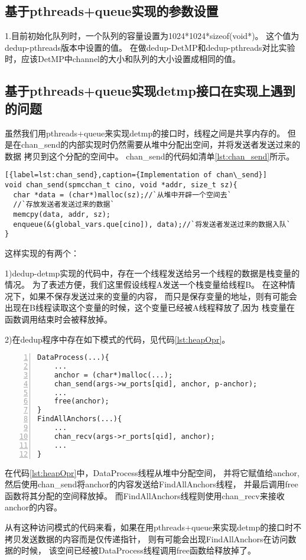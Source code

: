 \subsection{基于pthreads+queue实现的参数设置}

1.目前初始化队列时，一个队列的容量设置为1024*1024*sizeof(void*)。
这个值为dedup-pthreads版本中设置的值。
在做dedup-DetMP和dedup-pthreads对比实验时，应该DetMP中channel的大小和队列的大小设置成相同的值。

\subsection{基于pthreads+queue实现detmp接口在实现上遇到的问题}

虽然我们用pthreads+queue来实现detmp的接口时，线程之间是共享内存的。
但是在chan\_send的内部实现时仍然需要从堆中分配出空间，并将发送者发送过来的数据
拷贝到这个分配的空间中。
chan\_send的代码如清单\ref{lst:chan_send}所示。

\begin{lstlisting}[{label=lst:chan_send},caption={Implementation of chan\_send}]
void chan_send(spmcchan_t cino, void *addr, size_t sz){
  char *data = (char*)malloc(sz);//`从堆中开辟一个空间去`
  //`存放发送者发送过来的数据`
  memcpy(data, addr, sz);
  enqueue(&(global_vars.que[cino]), data);//`将发送者发送过来的数据入队`
}		
\end{lstlisting}

这样实现的有两个：

1)dedup-detmp实现的代码中，存在一个线程发送给另一个线程的数据是栈变量的情况。
为了表述方便，我们这里假设线程A发送一个栈变量给线程B。
在这种情况下，如果不保存发送过来的变量的内容，
而只是保存变量的地址，则有可能会
出现在B线程读取这个变量的时候，这个变量已经被A线程释放了,因为
栈变量在函数调用结束时会被释放掉。

2)在dedup程序中存在如下模式的代码，见代码\ref{lst:heapOpr}。
\begin{lstlisting}[label={lst:heapOpr},caption={Heap Operation Pattern},numbers=left,float]
DataProcess(...){
	...
	anchor = (char*)malloc(...);
	chan_send(args->w_ports[qid], anchor, p-anchor);
	...
	free(anchor);
}
FindAllAnchors(...){
	...
	chan_recv(args->r_ports[qid], anchor);
	...
}
\end{lstlisting}
在代码\ref{lst:heapOpr}中，DataProcess线程从堆中分配空间，
并将它赋值给anchor,
然后使用chan\_send将anchor的内容发送给FindAllAnchors线程，
并最后调用free函数将其分配的空间释放掉。
而FindAllAnchors线程则使用chan\_recv来接收anchor的内容。

从有这种访问模式的代码来看，如果在用pthreads+queue来实现detmp的接口时不
拷贝发送数据的内容而是仅传递指针，
则有可能会出现FindAllAnchors在访问数据的时候，
该空间已经被DataProcess线程调用free函数给释放掉了。






